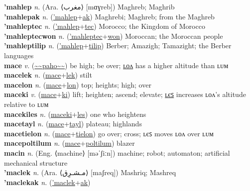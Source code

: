 \textbf{'mahlep} \textit{n.} (Ara. ⟨مغرب‎⟩ [mɑɣreb])
Maghreb; Maghrib \label{'mahlep} \\
\textbf{'mahlepak} \textit{n.} (\hyperref['mahlep]{'mahlep}+\hyperref[ak]{ak})
Maghrebi; Maghreb; from the Maghreb \label{'mahlepak} \\
\textbf{'mahleptec} \textit{n.} (\hyperref['mahlep]{'mahlep}+\hyperref[tec]{tec})
Morocco; the Kingdom of Morocco \label{'mahleptec} \\
\textbf{'mahleptecwon} \textit{n.} (\hyperref['mahleptec]{'mahleptec}+\hyperref[won]{won})
Moroccan; the Moroccan people \label{'mahleptecwon} \\
\textbf{'mahleptilip} \textit{n.} (\hyperref['mahlep]{'mahlep}+\hyperref[tilip]{tilip})
Berber; Amazigh; Tamazight; the Berber languages \label{'mahleptilip} \\
\textbf{mace} \textit{v.} (\hyperref[paho]{\~{}\~{}paho\~{}\~{}})
be high; be over; \hyperref[macelon]{ʟᴏᴧ} has a higher altitude than ʟᴜᴍ \label{mace} \\
\textbf{macelek} \textit{n.} (\hyperref[mace]{mace}+\hyperref[lek]{lek})
stilt \label{macelek} \\
\textbf{macelon} \textit{n.} (\hyperref[mace]{mace}+\hyperref[lon]{lon})
top; heights; high; over \label{macelon} \\
\textbf{maceki} \textit{v.} (\hyperref[mace]{mace}+\hyperref[ki]{ki})
lift; heighten; ascend; elevate; \hyperref[macekiles]{ʟєꜱ} increases ʟᴏᴧ's altitude relative to ʟᴜᴍ \label{maceki} \\
\textbf{macekiles} \textit{n.} (\hyperref[maceki]{maceki}+\hyperref[les]{les})
one who heightens \label{macekiles} \\
\textbf{macetayl} \textit{n.} (\hyperref[mace]{mace}+\hyperref[tayl]{tayl})
plateau; highlands \label{macetayl} \\
\textbf{macetielon} \textit{n.} (\hyperref[mace]{mace}+\hyperref[tielon]{tielon})
go over; cross; ʟєꜱ moves ʟᴏᴧ over ʟᴜᴍ \label{macetielon} \\
\textbf{macepoltilum} \textit{n.} (\hyperref[mace]{mace}+\hyperref[poltilum]{poltilum})
blazer \label{macepoltilum} \\
\textbf{macin} \textit{n.} (Eng. ⟨machine⟩ [məˈʃiːn])
machine; robot; automaton; artificial mechanical structure \label{macin} \\
\textbf{'maclek} \textit{n.} (Ara. ⟨مـشـرِق‎‎⟩ [maʃreq])
Mashriq; Mashreq \label{'maclek} \\
\textbf{'maclekak} \textit{n.} (\hyperref['maclek]{'maclek}+\hyperref[ak]{ak})

